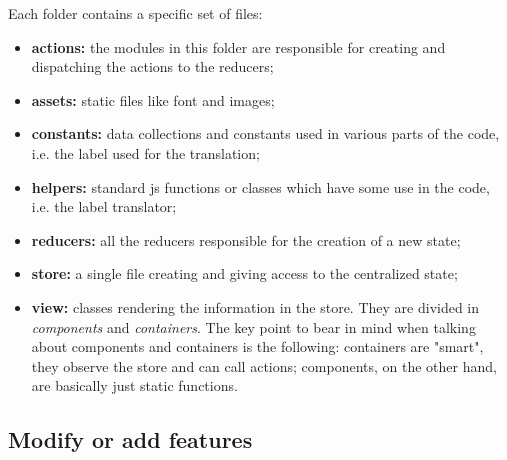 Each folder contains a specific set of files:
\begin{itemize}
	\item \textbf{actions:} the modules in this folder are responsible for creating and dispatching the actions to the reducers;
	\item \textbf{assets:} static files like font and images;
	\item \textbf{constants:} data collections and constants used in various parts of the code, i.e. the label used for the translation;
	\item \textbf{helpers:} standard js functions or classes which have some use in the code, i.e. the label translator;
	\item \textbf{reducers:} all the reducers responsible for the creation of a new state;
	\item \textbf{store:} a single file creating and giving access to the centralized state;
	\item \textbf{view:} classes rendering the information in the store. They are divided in \textit{components} and \textit{containers}.	 The key point to bear in mind when talking about components and containers is the following: containers are "smart", they observe the store and can call actions; components, on the other hand, are basically just static functions.
\end{itemize}

\subsection{Modify or add features}
